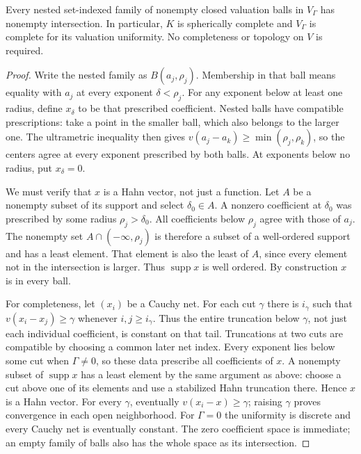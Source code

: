 \documentclass[11pt,letterpaper]{article}
\numberwithin{equation}{section}
\theoremstyle{definition}
\theoremstyle{remark}
\newcommand{\supp}{\operatorname{supp}}
\begin{document}
\begin{proposition}
\label{duals:prop:spherical}
Every nested set-indexed family of nonempty closed valuation balls in
$V_\Gamma$ has nonempty intersection. In particular, $K$ is spherically
complete and $V_\Gamma$ is complete for its valuation uniformity.
No completeness or topology on $V$ is required.
\end{proposition}
\begin{proof}
Write the nested family as $B(a_j,\rho_j)$. Membership in that ball
means equality with $a_j$ at every exponent $\delta<\rho_j$.
For any exponent below at least one radius, define $x_\delta$ to be
that prescribed coefficient. Nested balls have compatible prescriptions: take a point in the smaller
ball, which also belongs to the larger one. The ultrametric inequality
then gives $v(a_j-a_k)\ge\min(\rho_j,\rho_k)$, so the centers agree
at every exponent prescribed by both balls. At exponents below no
radius, put $x_\delta=0$.

We must verify that $x$ is a Hahn vector, not just a function.
Let $A$ be a nonempty subset of its support and select $\delta_0\in A$.
A nonzero coefficient at $\delta_0$ was prescribed by some radius
$\rho_j>\delta_0$. All coefficients below $\rho_j$ agree with those
of $a_j$. The nonempty set $A\cap(-\infty,\rho_j)$ is therefore a
subset of a well-ordered support and has a least element. That element
is also the least of $A$, since every element not in the intersection
is larger. Thus $\supp x$ is well ordered. By construction $x$ is in
every ball.

For completeness, let $(x_i)$ be a Cauchy net. For each cut $\gamma$
there is $i_\gamma$ such that $v(x_i-x_j)\ge\gamma$ whenever
$i,j\ge i_\gamma$. Thus the entire truncation below $\gamma$, not just
each individual coefficient, is constant on that tail. Truncations at
two cuts are compatible by choosing a common later net index.
Every exponent lies below some cut when $\Gamma\ne0$, so these data
prescribe all coefficients of $x$. A nonempty subset of $\supp x$ has
a least element by the same argument as above: choose a cut above one
of its elements and use a stabilized Hahn truncation there. Hence $x$
is a Hahn vector. For every $\gamma$, eventually $v(x_i-x)\ge\gamma$;
raising $\gamma$ proves convergence in each open neighborhood.
For $\Gamma=0$ the uniformity is discrete and every Cauchy net is
eventually constant. The zero coefficient space is immediate; an empty
family of balls also has the whole space as its intersection.
\end{proof}
\end{document}
